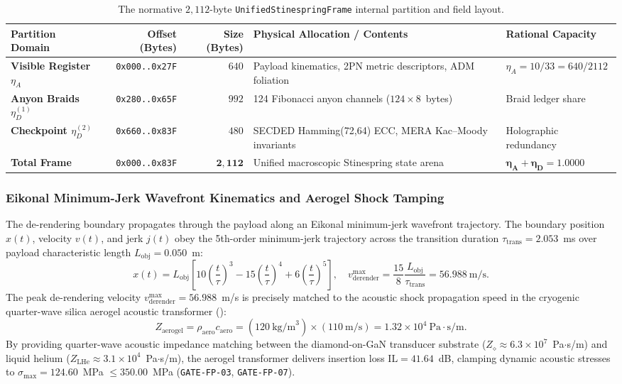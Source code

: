 \documentclass[11pt,onecolumn]{article}
\begin{document}
\begin{table}[!htbp]
\centering\small
\setlength{\tabcolsep}{5pt}
\caption{The normative $2{,}112$-byte \texttt{UnifiedStinespringFrame} internal partition and field layout.}
\label{tab:frame_2112}
\begin{tabularx}{\textwidth}{@{}l r r p{5.0cm} X@{}}
\toprule
Partition Domain & Offset (Bytes) & Size (Bytes) & Physical Allocation / Contents & Rational Capacity \\
\midrule
\textbf{Visible Register $\eta_A$} & \texttt{0x000..0x27F} & $640$ & Payload kinematics, 2PN metric descriptors, ADM foliation & $\eta_A = 10/33 = 640/2112$ \\
\addlinespace
\textbf{Anyon Braids $\eta_D^{(1)}$} & \texttt{0x280..0x65F} & $992$ & 124 Fibonacci anyon channels ($124 \times 8$~bytes) & Braid ledger share \\
\addlinespace
\textbf{Checkpoint $\eta_D^{(2)}$} & \texttt{0x660..0x83F} & $480$ & SECDED Hamming(72,64) ECC, MERA Kac--Moody invariants & Holographic redundancy \\
\midrule
\textbf{Total Frame} & \texttt{0x000..0x83F} & $\mathbf{2{,}112}$ & Unified macroscopic Stinespring state arena & $\mathbf{\eta_A + \eta_D = 1.0000}$ \\
\bottomrule
\end{tabularx}
\end{table}

\subsubsection{Eikonal Minimum-Jerk Wavefront Kinematics and Aerogel Shock Tamping}
The de-rendering boundary propagates through the payload along an Eikonal minimum-jerk wavefront trajectory. The boundary position $x(t)$, velocity $v(t)$, and jerk $j(t)$ obey the 5th-order minimum-jerk trajectory across the transition duration $\tau_{\text{trans}} = 2.053$~ms over payload characteristic length $L_{\text{obj}} = 0.050$~m:
\begin{equation}
x(t) = L_{\text{obj}}\left[10\left(\frac{t}{\tau}\right)^3 - 15\left(\frac{t}{\tau}\right)^4 + 6\left(\frac{t}{\tau}\right)^5\right], \quad v_{\text{derender}}^{\max} = \frac{15}{8}\frac{L_{\text{obj}}}{\tau_{\text{trans}}} = 56.988~\text{m/s}.
\label{eq:v_derender_max}
\end{equation}
The peak de-rendering velocity $v_{\text{derender}}^{\max} = 56.988$~m/s is precisely matched to the acoustic shock propagation speed in the cryogenic quarter-wave silica aerogel acoustic transformer ():
\begin{equation}
Z_{\text{aerogel}} = \rho_{\text{aero}} c_{\text{aero}} = (120~\text{kg/m}^3)\times (110~\text{m/s}) = 1.32\times 10^4~\text{Pa}\cdot\text{s/m}.
\end{equation}
By providing quarter-wave acoustic impedance matching between the diamond-on-GaN transducer substrate ($Z_{\diamond} \approx 6.3\times 10^7$~Pa$\cdot$s/m) and liquid helium ($Z_{\text{LHe}} \approx 3.1\times 10^4$~Pa$\cdot$s/m), the aerogel transformer delivers insertion loss $\text{IL} = 41.64$~dB, clamping dynamic acoustic stresses to $\sigma_{\max} = 124.60$~MPa $\le 350.00$~MPa (\texttt{GATE-FP-03}, \texttt{GATE-FP-07}).
\end{document}
